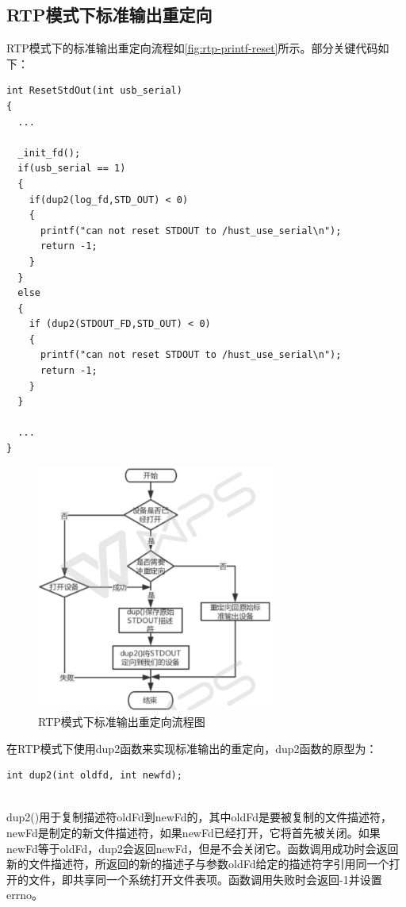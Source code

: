 \subsection{RTP模式下标准输出重定向}
	RTP模式下的标准输出重定向流程如\autoref{fig:rtp-printf-reset}所示。部分关键代码如下：
\lstset{language=C}
\begin{lstlisting}
int ResetStdOut(int usb_serial)
{
  ...
	
  _init_fd();
  if(usb_serial == 1)
  {
    if(dup2(log_fd,STD_OUT) < 0)
    {
      printf("can not reset STDOUT to /hust_use_serial\n");	  
	  return -1;
	}
  }
  else
  {
    if (dup2(STDOUT_FD,STD_OUT) < 0)
    {
	  printf("can not reset STDOUT to /hust_use_serial\n");
	  return -1;
	}
  }
  
  ...
}
\end{lstlisting}

\begin{figure}[!h]
\centering
\includegraphics[width=0.7\textwidth]{./graphics/RTP-STDOUT-RESET.pdf}
\caption{RTP模式下标准输出重定向流程图}\label{fig:rtp-printf-reset}
\end{figure}


在RTP模式下使用dup2函数来实现标准输出的重定向，dup2函数的原型为：
\lstset{language=C}
\begin{lstlisting}
int dup2(int oldfd, int newfd);
\end{lstlisting}\\
dup2()用于复制描述符oldFd到newFd的，其中oldFd是要被复制的文件描述符，newFd是制定的新文件描述符，如果newFd已经打开，它将首先被关闭。如果newFd等于oldFd，dup2会返回newFd，但是不会关闭它。函数调用成功时会返回新的文件描述符，所返回的新的描述子与参数oldFd给定的描述符字引用同一个打开的文件，即共享同一个系统打开文件表项。函数调用失败时会返回-1并设置errno。

